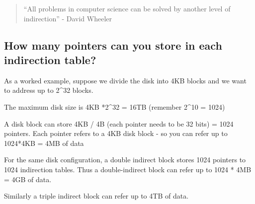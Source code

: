 \begin{quote}
``All problems in computer science can be solved by another level of
indirection'' - David Wheeler
\end{quote}

\subsection{How many pointers can you store in each indirection
table?}\label{how-many-pointers-can-you-store-in-each-indirection-table}

As a worked example, suppose we divide the disk into 4KB blocks and we
want to address up to 2\^{}32 blocks.

The maximum disk size is 4KB *2\^{}32 = 16TB (remember 2\^{}10 = 1024)

A disk block can store 4KB / 4B (each pointer needs to be 32 bits) =
1024 pointers. Each pointer refers to a 4KB disk block - so you can
refer up to 1024*4KB = 4MB of data

For the same disk configuration, a double indirect block stores 1024
pointers to 1024 indirection tables. Thus a double-indirect block can
refer up to 1024 * 4MB = 4GB of data.

Similarly a triple indirect block can refer up to 4TB of data.
